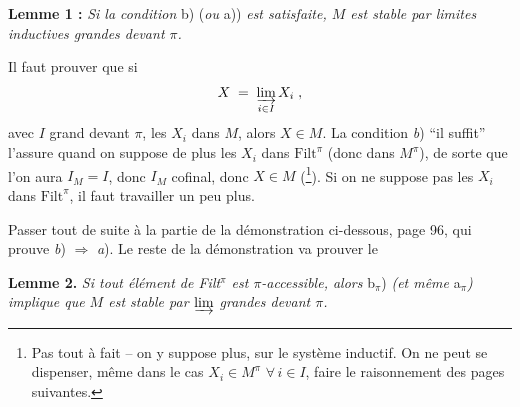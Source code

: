 \documentclass[11pt]{article}
\newcommand{\msp}[1]{\marginpar{\footnotesize [#1]}}
\newcommand{\Filt}{\mathrm{Filt}}
\begin{document}
\textbf{Lemme 1 :} \textit{Si la condition} b) (\textit{ou} a)) \textit{est satisfaite, $M$ est stable par limites inductives grandes devant $\pi$.}

Il faut prouver que si
\msp{page 90}
\[
X \;=\; \varinjlim_{i\in I} X_i \;,
\]
avec $I$ grand devant $\pi$, les $X_i$ dans $M$, alors $X\in M$. La condition \textit{b}) “il suffit” l'assure quand on suppose de plus les $X_i$ dans $\Filt^\pi$ (donc dans $M^\pi$), de sorte que l'on aura $I_M=I$, donc $I_M$ cofinal, donc $X\in M$ (\footnote[42]{Pas tout à fait – on y suppose plus, sur le système inductif. On ne peut se dispenser, même dans le cas $X_i\in M^\pi$ $\forall\, i\in I$, faire le raisonnement des pages suivantes.}). Si on ne suppose pas les $X_i$ dans $\Filt^\pi$, il faut travailler un peu plus.

Passer tout de suite à la partie de la démonstration ci-dessous, page 96, qui prouve \textit{b}) $\Longrightarrow$ \textit{a}). Le reste de la démonstration va prouver le

\textbf{Lemme 2.} \textit{Si tout élément de Filt$^\pi$ est $\pi$-accessible, alors} b$_\pi$) \textit{(et même} a$_\pi$\textit{) implique que $M$ est stable par $\varinjlim$ grandes devant $\pi$.}
\end{document}
